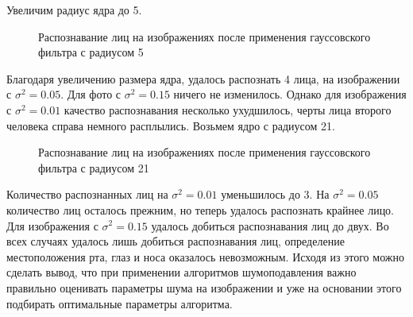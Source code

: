 Увеличим радиус ядра до 5.
\begin{figure}[H]
	\begin{minipage}[H]{0.32\linewidth}
	\end{minipage}
	\begin{minipage}[H]{0.32\linewidth}
	\end{minipage}
	\begin{minipage}[H]{0.32\linewidth}
	\end{minipage}
	\caption{Распознавание лиц на изображениях после применения гауссовского фильтра с радиусом 5}
\end{figure}
Благодаря увеличению размера ядра, удалось распознать 4 лица, на изображении с $\sigma^2=0.05$. Для фото с $\sigma^2=0.15$ ничего не изменилось. Однако для изображения с  $\sigma^2=0.01$ качество распознавания несколько ухудшилось, черты лица второго человека справа немного расплылись.
Возьмем ядро с радиусом 21.
\begin{figure}[H]
	\begin{minipage}[H]{0.32\linewidth}
	\end{minipage}
	\begin{minipage}[H]{0.32\linewidth}
	\end{minipage}
	\begin{minipage}[H]{0.32\linewidth}
	\end{minipage}
	\caption{Распознавание лиц на изображениях после применения гауссовского фильтра с радиусом 21}
\end{figure}
Количество распознанных лиц на $\sigma^2=0.01$ уменьшилось до 3. На $\sigma^2=0.05$ количество лиц осталось прежним, но теперь удалось распознать крайнее лицо. Для изображения с $\sigma^2=0.15$ удалось добиться распознавания лиц до двух. Во всех случаях удалось лишь добиться распознавания лиц, определение местоположения рта, глаз и носа оказалось невозможным.
Исходя из этого можно сделать вывод, что при применении алгоритмов шумоподавления важно правильно оценивать параметры шума на изображении и уже на основании этого подбирать оптимальные параметры алгоритма.